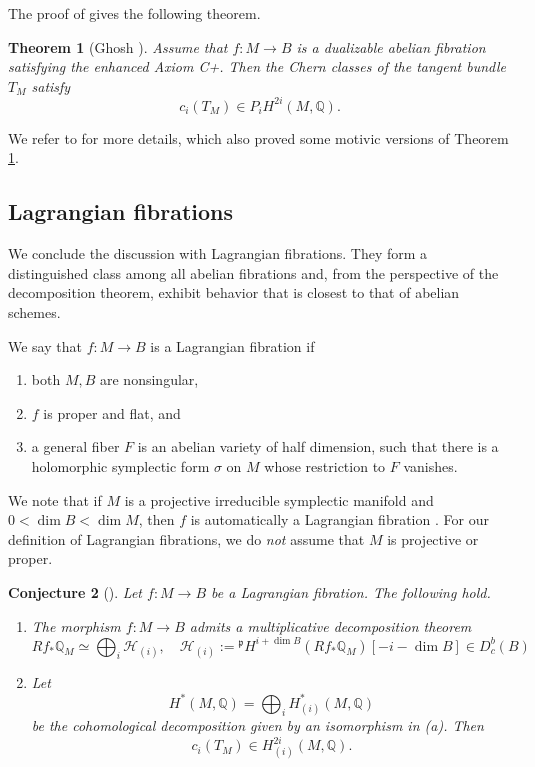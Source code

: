 \documentclass[11pt]{amsart}
\theoremstyle{plain}
\newtheorem{thm}{Theorem}[section]
\newtheorem{conj}[thm]{Conjecture}
\theoremstyle{definition}
\theoremstyle{remark}
\newcommand{\BQ}{{\mathbb{Q}}}
\newcommand{\CH}{{\mathcal H}}
\newcommand{\Fp}{{\mathfrak{p}}}
\begin{document}
The proof of \cite[Theorem 0.1]{Ghosh} gives the following theorem.

\begin{thm}[Ghosh \cite{Ghosh}]\label{thm3.10}
    Assume that $f: M \to B$ is a dualizable abelian fibration satisfying the enhanced Axiom C+. Then the Chern classes of the tangent bundle $T_M$ satisfy
    \[
    c_i(T_M) \in P_i H^{2i}(M, \BQ).
    \]
\end{thm}

We refer to \cite{Ghosh} for more details, which also proved some motivic versions of Theorem \ref{thm3.10}.
 
\subsection{Lagrangian fibrations}
We conclude the discussion with Lagrangian fibrations. They form a distinguished class among all abelian fibrations and, from the perspective of the decomposition theorem, exhibit behavior that is closest to that of abelian schemes.

We say that $f: M \to B$ is a Lagrangian fibration if 
\begin{enumerate}
    \item[(a)] both $M, B$ are nonsingular, 
    \item[(b)] $f$ is proper and flat, and
    \item[(b)] a general fiber $F$ is an abelian variety of half dimension, such that there is a holomorphic symplectic form $\sigma$ on $M$ whose restriction to $F$ vanishes.
\end{enumerate}


We note that if $M$ is a projective irreducible symplectic manifold and $0< \dim B < \dim M$, then $f$ is automatically a Lagrangian fibration \cite{Mat}. For our definition of Lagrangian fibrations, we do \emph{not} assume that $M$ is projective or proper.


\begin{conj}[\cite{BMSY1, Shen_ICM}]\label{conj}
Let $f: M \to B$ be a Lagrangian fibration. The following hold.
\begin{enumerate}
    \item[(a)]  The morphism $f: M \to B$ admits a multiplicative decomposition theorem
    \[
    Rf_* \BQ_M \simeq \bigoplus_{i} \CH_{(i)},\quad \CH_{(i)} := {^\Fp}H^{i + \dim B}(Rf_{*}\BQ_M)[-i - \dim B] \in D^b_c(B)    \]
    \item[(b)] Let 
    \[
    H^*(M, \BQ) = \bigoplus_{i} H_{(i)}^*(M, \BQ)
    \]
    be the cohomological decomposition given by an isomorphism in (a). Then 
    \[
    c_i(T_M) \in H^{2i}_{(i)}(M, \BQ).
    \]
\end{enumerate}
\end{conj}
\end{document}

